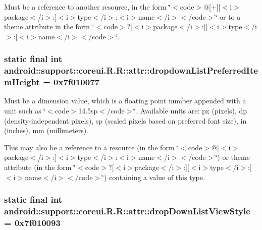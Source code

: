 Must be a reference to another resource, in the form \char`\"{}$<$code$>$@\mbox{[}+\mbox{]}\mbox{[}$<$i$>$package$<$/i$>$:\mbox{]}$<$i$>$type$<$/i$>$:$<$i$>$name$<$/i$>$$<$/code$>$\char`\"{} or to a theme attribute in the form \char`\"{}$<$code$>$?\mbox{[}$<$i$>$package$<$/i$>$:\mbox{]}\mbox{[}$<$i$>$type$<$/i$>$:\mbox{]}$<$i$>$name$<$/i$>$$<$/code$>$\char`\"{}. \hypertarget{classandroid_1_1support_1_1coreui_1_1_r_1_1attr_8cc6b457c3c64e486597c1b1179463a7}{
\subsubsection[{dropdownListPreferredItemHeight}]{\setlength{\rightskip}{0pt plus 5cm}static final int android::support::coreui.R.R::attr::dropdownListPreferredItemHeight = 0x7f010077}}
\label{classandroid_1_1support_1_1coreui_1_1_r_1_1attr_8cc6b457c3c64e486597c1b1179463a7}


Must be a dimension value, which is a floating point number appended with a unit such as \char`\"{}$<$code$>$14.5sp$<$/code$>$\char`\"{}. Available units are: px (pixels), dp (density-independent pixels), sp (scaled pixels based on preferred font size), in (inches), mm (millimeters). 

This may also be a reference to a resource (in the form \char`\"{}$<$code$>$@\mbox{[}$<$i$>$package$<$/i$>$:\mbox{]}$<$i$>$type$<$/i$>$:$<$i$>$name$<$/i$>$$<$/code$>$\char`\"{}) or theme attribute (in the form \char`\"{}$<$code$>$?\mbox{[}$<$i$>$package$<$/i$>$:\mbox{]}\mbox{[}$<$i$>$type$<$/i$>$:\mbox{]}$<$i$>$name$<$/i$>$$<$/code$>$\char`\"{}) containing a value of this type. \hypertarget{classandroid_1_1support_1_1coreui_1_1_r_1_1attr_f89da27b90bb648f2e5df7a883c403e1}{
\subsubsection[{dropDownListViewStyle}]{\setlength{\rightskip}{0pt plus 5cm}static final int android::support::coreui.R.R::attr::dropDownListViewStyle = 0x7f010093}}
\label{classandroid_1_1support_1_1coreui_1_1_r_1_1attr_f89da27b90bb648f2e5df7a883c403e1}


